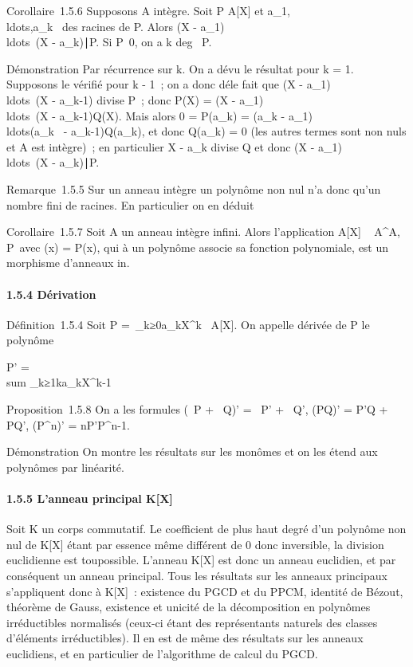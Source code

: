 \documentclass[]{article}
\begin{document}
Corollaire~1.5.6 Supposons A intègre. Soit P \in A{[}X{]} et
a\_1,\\ldots,a\_k~
des racines de P. Alors (X -
a\_1)\\ldots~(X
- a\_k)∣P. Si
P\neq~0, on a k \leq deg~
P.

Démonstration Par récurrence sur k. On a dé vu le résultat pour k = 1.
Supposons le vérifié pour k - 1~; on a donc dé le fait que (X -
a\_1)\\ldots~(X
- a\_k-1) divise P~; donc P(X) = (X -
a\_1)\\ldots~(X
- a\_k-1)Q(X). Mais alors 0 = P(a\_k) = (a\_k -
a\_1)\\ldots(a\_k~
- a\_k-1)Q(a\_k), et donc Q(a\_k) = 0 (les
autres termes sont non nuls et A est intègre)~; en particulier X -
a\_k divise Q et donc (X -
a\_1)\\ldots~(X
- a\_k)∣P.

Remarque~1.5.5 Sur un anneau intègre un polynôme non nul n'a donc qu'un
nombre fini de racines. En particulier on en déduit

Corollaire~1.5.7 Soit A un anneau intègre infini. Alors l'application
A{[}X{]} \rightarrow~ A^A,
P\mapsto~\tildeP avec
\tildeP(x) = P(x), qui à un polynôme associe sa
fonction polynomiale, est un morphisme d'anneaux in\jmathectif.

\paragraph{1.5.4 Dérivation}

Définition~1.5.4 Soit P =\
\sum  \_k≥0a\_kX^k~ \in
A{[}X{]}. On appelle dérivée de P le polynôme

P' = \\sum
\_k≥1ka\_kX^k-1

Proposition~1.5.8 On a les formules (\alpha~P + \beta~Q)' = \alpha~P' + \beta~Q', (PQ)' = P'Q
+ PQ', (P^n)' = nP'P^n-1.

Démonstration On montre les résultats sur les monômes et on les étend
aux polynômes par linéarité.

\paragraph{1.5.5 L'anneau principal K{[}X{]}}

Soit K un corps commutatif. Le coefficient de plus haut degré d'un
polynôme non nul de K{[}X{]} étant par essence même différent de 0 donc
inversible, la division euclidienne est tou\jmathours possible. L'anneau
K{[}X{]} est donc un anneau euclidien, et par conséquent un anneau
principal. Tous les résultats sur les anneaux principaux s'appliquent
donc à K{[}X{]}~: existence du PGCD et du PPCM, identité de Bézout,
théorème de Gauss, existence et unicité de la décomposition en polynômes
irréductibles normalisés (ceux-ci étant des représentants naturels des
classes d'éléments irréductibles). Il en est de même des résultats sur
les anneaux euclidiens, et en particulier de l'algorithme de calcul du
PGCD.
\end{document}
